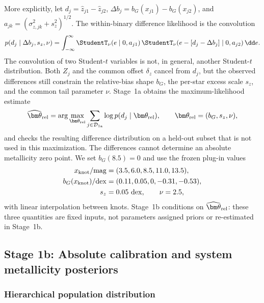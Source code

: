 More explicitly, let
$d_j=\widehat z_{j1}-\widehat z_{j2}$,
$\Delta b_j=b_G(x_{j1})-b_G(x_{j2})$, and
$a_{jk}=(\sigma_{z,jk}^2+s_z^2)^{1/2}$.  The within-binary difference likelihood is the convolution
\begin{equation}
 p(d_j\mid\Delta b_j,s_z,\nu)=
 \int_{-\infty}^{\infty}
 \StudentT_{\nu}\!\left(e\mid0,a_{j1}\right)
 \StudentT_{\nu}\!\left(e-[d_j-\Delta b_j]\mid0,a_{j2}\right)\dd e.
 \label{eq:difference-convolution}
\end{equation}
The convolution of two Student-$t$ variables is not, in general, another
Student-$t$ distribution.  Both $Z_j$ and the common offset $\delta_z$ cancel
from $d_j$, but the observed differences still constrain the relative-bias
shape $b_G$, the per-star excess scale $s_z$, and the common tail parameter
$\nu$.  Stage~1a obtains the maximum-likelihood estimate
\begin{equation}
 \widehat{\bm\theta}_{\rm rel}
 =\arg\max_{\bm\theta_{\rm rel}}\sum_{j\in\mathcal D_{\rm 1a}}
 \log p(d_j\mid\bm\theta_{\rm rel}),
 \qquad \bm\theta_{\rm rel}=(b_G,s_z,\nu),
 \label{eq:relative-mle}
\end{equation}
and checks the resulting difference distribution on a held-out subset that is
not used in this maximization.  The differences cannot determine an absolute
metallicity zero point.  We set
$b_G(8.5)=0$ and use the frozen
plug-in values
\begin{align}
 x_{\rm knot}/{\rm mag} &= (3.5,6.0,8.5,11.0,13.5),\\
 b_G(x_{\rm knot})/{\rm dex} &= (0.11,0.05,0,
 -0.31,-0.53),\\
 s_z &=0.05\ {\rm dex},\qquad \nu=2.5,
\end{align}
with linear interpolation between knots.  Stage~1b conditions on
$\widehat{\bm\theta}_{\rm rel}$: these three quantities are fixed inputs, not
parameters assigned priors or re-estimated in Stage~1b.

\subsection{Stage 1b: Absolute calibration and system metallicity posteriors}

\subsubsection{Hierarchical population distribution}

